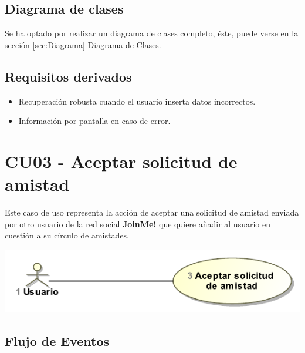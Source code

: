 \documentclass[12pt, a4paper, titlepage]{article}
\begin{document}
\subsection{Diagrama de clases}

Se ha optado por realizar un diagrama de clases completo, éste, puede verse en la sección \ref{sec:Diagrama} Diagrama de Clases.
\subsection{Requisitos derivados}

\begin{itemize}
	\item Recuperación robusta cuando el usuario inserta datos incorrectos.
	\item Información por pantalla en caso de error.
\end{itemize}

\section{CU03 - Aceptar solicitud de amistad}


Este caso de uso representa la acción de aceptar una solicitud de amistad enviada por otro usuario de la red social \textbf{JoinMe!} que quiere añadir al usuario en cuestión a su círculo de amistades.

\begin{center}
	\includegraphics{Imagenes/AceptarSolicitudAmistadCU.pdf}
\end{center}
\subsection{Flujo de Eventos}
\end{document}
